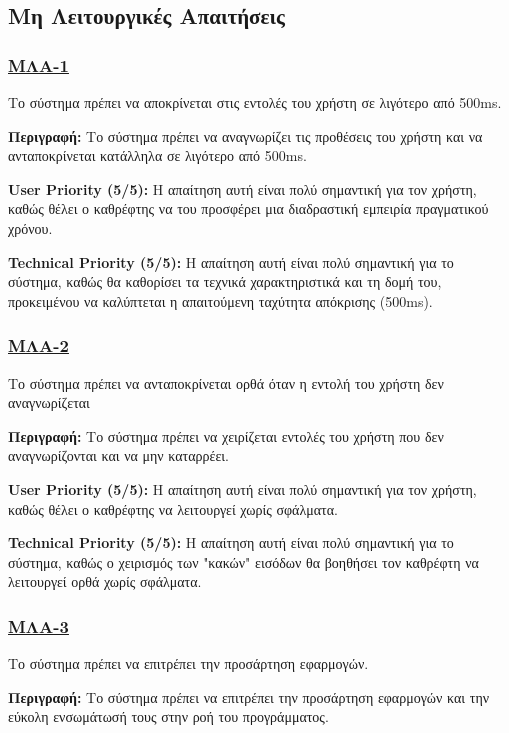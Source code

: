 \noindent\subsection{Μη Λειτουργικές Απαιτήσεις}

\subsubsection{\underline{ΜΛΑ-1}}
\noindent Το σύστημα πρέπει να αποκρίνεται στις εντολές του χρήστη σε λιγότερο από 500ms.

\noindent\textbf{Περιγραφή:} Το σύστημα πρέπει να αναγνωρίζει τις προθέσεις του χρήστη και να ανταποκρίνεται κατάλληλα σε λιγότερο από 500ms.

\noindent\textbf{User Priority (5/5):} Η απαίτηση αυτή είναι πολύ σημαντική για τον χρήστη, καθώς θέλει ο καθρέφτης να του προσφέρει μια διαδραστική εμπειρία πραγματικού χρόνου.

\noindent\textbf{Technical Priority (5/5):} Η απαίτηση αυτή είναι πολύ σημαντική για το σύστημα, καθώς θα καθορίσει τα τεχνικά χαρακτηριστικά και τη δομή του, προκειμένου να καλύπτεται η απαιτούμενη ταχύτητα απόκρισης (500ms).

\subsubsection{\underline{ΜΛΑ-2}}
\noindent Το σύστημα πρέπει να ανταποκρίνεται ορθά όταν η εντολή του χρήστη δεν αναγνωρίζεται

\noindent\textbf{Περιγραφή:} Το σύστημα πρέπει να χειρίζεται εντολές του χρήστη που δεν αναγνωρίζονται και να μην καταρρέει.

\noindent\textbf{User Priority (5/5):} Η απαίτηση αυτή είναι πολύ σημαντική για τον χρήστη, καθώς θέλει ο καθρέφτης να λειτουργεί χωρίς σφάλματα.

\noindent\textbf{Technical Priority (5/5):} Η απαίτηση αυτή είναι πολύ σημαντική για το σύστημα, καθώς ο χειρισμός των "κακών" εισόδων θα βοηθήσει τον καθρέφτη να λειτουργεί ορθά χωρίς σφάλματα.

\subsubsection{\underline{ΜΛΑ-3}}
\noindent Το σύστημα πρέπει να επιτρέπει την προσάρτηση εφαρμογών.

\noindent\textbf{Περιγραφή:} Το σύστημα πρέπει να επιτρέπει την προσάρτηση εφαρμογών και την εύκολη ενσωμάτωσή τους στην ροή του προγράμματος.


